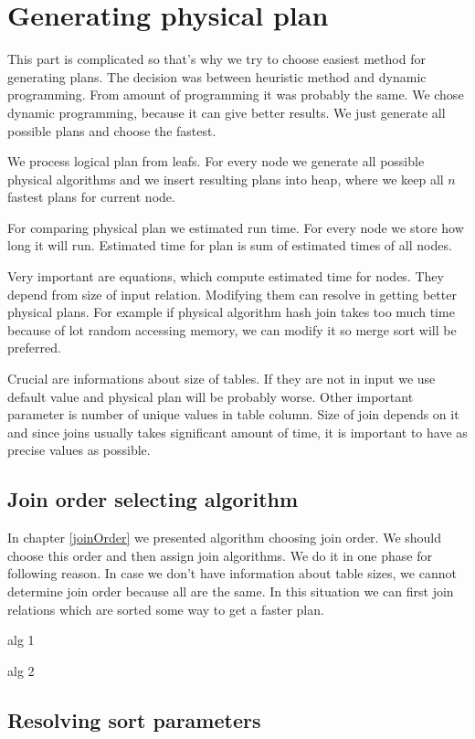 \section{Generating physical plan}

This part is complicated so that's why we try to choose easiest method for generating plans. The decision was between heuristic method and dynamic programming. From amount of programming it was probably the same. We chose dynamic programming, because it can give better results. We just generate all possible plans and choose the fastest.

We process logical plan from leafs. For every node we generate all possible physical algorithms and we insert resulting plans into heap, where we keep all $n$ fastest plans for current node.

For comparing physical plan we estimated run time. For every node we store how long it will run. Estimated time for plan is sum of estimated times of all nodes.

Very important are equations, which compute estimated time for nodes. They depend from size of input relation. Modifying them can resolve in getting better physical plans. For example if physical algorithm hash join takes too much time because of lot random accessing memory, we can modify it so merge sort will be preferred.

Crucial are informations about size of tables. If they are not in input we use default value and physical plan will be probably worse. Other important parameter is number of unique values in table column. Size of join depends on it and since joins usually takes significant amount of time, it is important to have as precise values as possible. 

\subsection{Join order selecting algorithm}

In chapter \ref{joinOrder} we presented algorithm choosing join order. We should choose this order and then assign join algorithms. We do it in one phase for following reason. In case we don't have information about table sizes, we cannot determine join order because all are the same. In this situation we can first join relations which are sorted some way to get a faster plan.

alg 1

alg 2





\subsection{Resolving sort parameters}